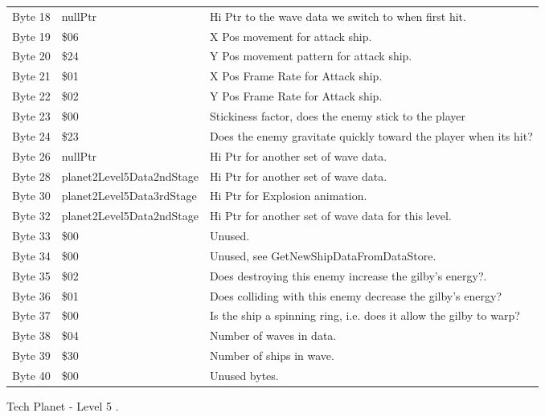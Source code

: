 \begin{figure}[H]
{\begin{adjustbox}{width=12cm}
\begin{tabular}{lll}
 Byte 18 & nullPtr                   & Hi Ptr to the wave data we switch to when first hit.               \\
 Byte 19 & \$06                       & X Pos movement for attack ship.                                    \\
 Byte 20 & \$24                       & Y Pos movement pattern for attack ship.                            \\
 Byte 21 & \$01                       & X Pos Frame Rate for Attack ship.                                  \\
 Byte 22 & \$02                       & Y Pos Frame Rate for Attack ship.                                  \\
 Byte 23 & \$00                       & Stickiness factor, does the enemy stick to the player              \\
 Byte 24 & \$23                       & Does the enemy gravitate quickly toward the player when its hit?   \\
 Byte 26 & nullPtr                   & Hi Ptr for another set of wave data.                               \\
 Byte 28 & planet2Level5Data2ndStage & Hi Ptr for another set of wave data.                               \\
 Byte 30 & planet2Level5Data3rdStage & Hi Ptr for Explosion animation.                                    \\
 Byte 32 & planet2Level5Data2ndStage & Hi Ptr for another set of wave data for this level.                \\
 Byte 33 & \$00                       & Unused.                                                            \\
 Byte 34 & \$00                       & Unused, see GetNewShipDataFromDataStore.                           \\
 Byte 35 & \$02                       & Does destroying this enemy increase the gilby's energy?.           \\
 Byte 36 & \$01                       & Does colliding with this enemy decrease the gilby's energy?        \\
 Byte 37 & \$00                       & Is the ship a spinning ring, i.e. does it allow the gilby to warp? \\
 Byte 38 & \$04                       & Number of waves in data.                                           \\
 Byte 39 & \$30                       & Number of ships in wave.                                           \\
 Byte 40 & \$00                       & Unused bytes.                                                      \\
\bottomrule
\end{tabular}

  \end{adjustbox}

  }\caption*{Tech Planet - Level 5
.}
\end{figure}

